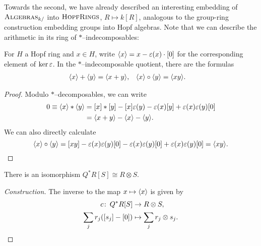 Towards the second, we have already described an interesting embedding of \(\normalfont\textsc{Algebras}_{k/}\) into \(\normalfont\textsc{HopfRings}\), \(R \mapsto k[R]\), analogous to the group-ring construction embedding groups into Hopf algebras.  Note that we can describe the arithmetic in its ring of \(\ast\)--indecomposables:

\begin{lemma}\label{ArithmeticInQAst}
For \(H\) a Hopf ring and \(x \in H\), write \(\langle x\rangle = x - \varepsilon(x) \cdot [0]\) for the corresponding element of \(\ker \varepsilon\).  In the \(\ast\)--indecomposable quotient, there are the formulas
\begin{align*}
\langle x\rangle + \langle y\rangle & = \langle x + y\rangle, &
\langle x\rangle \circ \langle y\rangle & = \langle x y\rangle.
\end{align*}
\end{lemma}
\begin{proof}
Modulo \(\ast\)--decomposables, we can write
\begin{align*}
0 \equiv \langle x\rangle \ast \langle y\rangle & = [x] \ast [y] - [x] \varepsilon(y) - \varepsilon(x) [y] + \varepsilon(x) \varepsilon(y) [0] \\
& = \langle x + y\rangle - \langle x\rangle - \langle y\rangle.
\end{align*}
We can also directly calculate \[\langle x\rangle \circ \langle y\rangle = [x y] - \varepsilon(x) \varepsilon(y) [0] - \varepsilon(x) \varepsilon(y) [0] + \varepsilon(x) \varepsilon(y) [0] = \langle x y\rangle. \qedhere\]
\end{proof}

\begin{corollary}\label{QAstAndTensors}
There is an isomorphism \(Q^* R[S] \cong R \otimes S\).
\end{corollary}
\begin{proof}[Construction]
The inverse to the map \(x \mapsto \langle x\rangle\) is given by
\begin{align*}
c\colon\thinspace Q^* R[S] & \to R \otimes S, \\
\sum_j r_j ([s_j] - [0]) & \mapsto \sum_j r_j \otimes s_j. \qedhere
\end{align*}
\end{proof}

